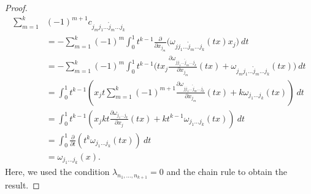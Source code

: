 \begin{proof}
\begin{equation*}
\begin{aligned}
\sum_{m=1}^{k} &(-1)^{m+1} c_{j_mj_1\dots\mathring j_{m}\dots j_k} \\
	& = -\sum_{m=1}^k (-1)^m \int_0^1 t^{k-1} \frac{\partial}{\partial x_{j_m}}\big( \omega_{jj_1\dots\mathring j_m\dots j_k}(tx) x_j \big)\ dt \\
	& = -\sum_{m=1}^k (-1)^m \int_0^1 t^{k-1} \big( tx_j\frac{\partial \omega_{jj_1\dots\mathring j_m\dots j_k} }{\partial x_{j_m}}(tx) + \omega_{j_mj_1\dots\mathring j_m\dots j_k}(tx)  \big)\ dt \\
       & = \int_0^1 t^{k-1} \left( x_j t \sum_{m=1}^{k} (-1)^{m+1}\frac{\partial \omega_{jj_1\dots\mathring j_m\dots j_k}}{\partial x_{j_m}}(tx) + k \omega_{j_1\dots j_k}(tx)  \right) \ dt \\
       & = \int_0^1 t^{k-1} \left( x_j k t \frac{\partial \omega_{j_1\dots j_k}}{\partial x_j}(tx) + kt^{k-1} \omega_{j_1\dots j_k}(tx)\right)\ dt \\
       & = \int_0^1 \frac{\partial}{\partial t}(t^k \omega_{j_1\dots j_k}(tx) )\ dt \\
      	& = \omega_{j_1\dots j_k}(x).
\end{aligned}
\end{equation*}
Here, we used the condition $\lambda_{n_1,\dots,n_{k+1}} = 0$ and the chain rule to obtain the result.
\end{proof}


